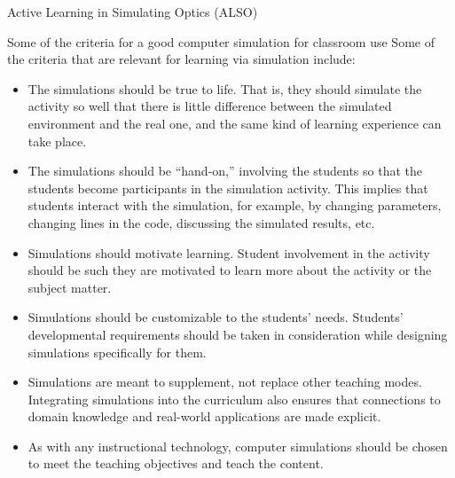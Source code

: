\documentclass[serif ,mathserif, 8pt]{beamer}
\begin{document}
\begin{frame}{Active Learning in Simulating Optics (ALSO)}

\begin{block}{Some of the criteria for a good computer simulation for classroom use}
	Some of the criteria that are relevant for learning via simulation include:
	\begin{itemize}
		\item The simulations should be true to life. That is, they should simulate the activity so well that there is little
		difference between the simulated environment and the real one, and the same kind of learning experience can
		take place.
		\item The simulations should be “hand-on,” involving the students so that the students become participants in the
		simulation activity. This implies that students interact with the simulation, for example, by changing parameters, changing lines in the code, discussing the simulated results, etc.
		\item Simulations should motivate learning. Student involvement in the activity should be such they are motivated to learn more about the activity or the subject matter.
		\item Simulations should be customizable to the students' needs. Students' developmental requirements should be
		taken in consideration while designing simulations specifically for them.
		\item Simulations are meant to supplement, not replace other teaching modes. Integrating simulations into the
		curriculum also ensures that connections to domain knowledge and real-world applications are made explicit.
		\item As with any instructional technology, computer simulations should be chosen to meet the teaching objectives
		and teach the content.
	\end{itemize}
\end{block}

\end{frame}
\end{document}
